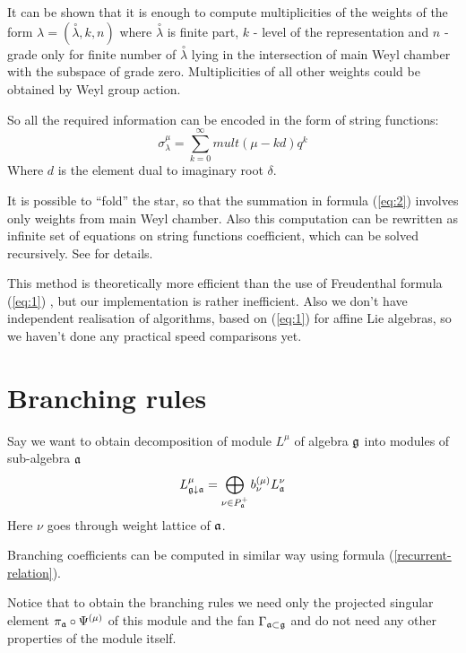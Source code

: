 \documentclass[a4paper,12pt]{article}
\theoremstyle{definition} \newtheorem{Def}{Definition}
\begin{document}
It can be shown that it is enough to compute multiplicities of the
weights of the form $\lambda=(\overset{\circ }{\lambda},k,n)$ where
$\overset{\circ }{\lambda}$ is finite part, $k$ - level of the
representation and $n$ - grade only for finite number of
$\overset{\circ}{\lambda}$ lying in the intersection of main Weyl
chamber with the subspace of grade zero.
Multiplicities of all other weights could be obtained by Weyl group
action. 

So all the required information can be encoded in the form of string functions:
\begin{equation}
  \label{eq:3}
  \sigma^{\mu}_{\lambda}=\sum_{k=0}^{\infty} mult(\mu-kd)q^k
\end{equation}
Where $d$ is the element dual to imaginary root $\delta$. 

It is possible to ``fold'' the star, so that the summation in formula
(\ref{eq:2}) involves only weights from main Weyl chamber. Also this
computation can be rewritten as infinite set of equations on string
functions coefficient, which can be solved recursively. See
\cite{kulish4sfa} for details.

This method is theoretically more efficient than the use of Freudenthal
formula (\ref{eq:1}) \cite{Nazarov2008}, but our implementation is
rather inefficient. Also we don't have independent realisation of algorithms,
based on (\ref{eq:1}) for affine Lie algebras, so we haven't done any
practical speed comparisons yet.
\section{Branching rules}
\label{sec:branching-rules}

Say we want to obtain decomposition of module $L^{\mu}$ of algebra
$\frak{g}$ into modules of sub-algebra $\frak{a}$
\begin{equation}
  \label{eq:4}
  L_{\frak{g}\downarrow \frak{a}}^{\mu }=\bigoplus\limits_{\nu \in P_{\frak{a}%
    }^{+}}b_{\nu }^{\left( \mu \right) }L_{\frak{a}}^{\nu }
\end{equation}
Here $\nu$ goes through weight lattice of $\frak{a}$. 

Branching coefficients can be computed in similar way using formula
(\ref{recurrent-relation}). 


Notice that to obtain the branching
rules we need only the projected singular element $\pi _{\frak{a}}\circ \Psi
^{\left( \mu\right) }$ of this module 
and the fan $\Gamma
_{\frak{a}\subset \frak{g}}$ and do not need any other properties of the module itself. 
\end{document}
